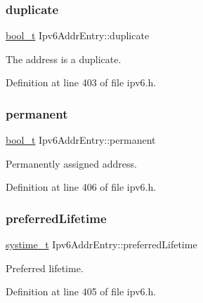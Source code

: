 \subsubsection{\texorpdfstring{duplicate}{duplicate}}
{\footnotesize\ttfamily \hyperlink{compiler__port_8h_a812d16e5494522586b3784e55d479912}{bool\+\_\+t} Ipv6\+Addr\+Entry\+::duplicate}



The address is a duplicate. 



Definition at line 403 of file ipv6.\+h.

\mbox{\label{structIpv6AddrEntry_a196db6647dd1196a1c3a06c8a4083a48}} 
\subsubsection{\texorpdfstring{permanent}{permanent}}
{\footnotesize\ttfamily \hyperlink{compiler__port_8h_a812d16e5494522586b3784e55d479912}{bool\+\_\+t} Ipv6\+Addr\+Entry\+::permanent}



Permanently assigned address. 



Definition at line 406 of file ipv6.\+h.

\mbox{\label{structIpv6AddrEntry_a4d368a125e163baf554e7622edff555f}} 
\subsubsection{\texorpdfstring{preferred\+Lifetime}{preferredLifetime}}
{\footnotesize\ttfamily \hyperlink{compiler__port_8h_ae3e32a98d431a02106616da3071832dd}{systime\+\_\+t} Ipv6\+Addr\+Entry\+::preferred\+Lifetime}



Preferred lifetime. 



Definition at line 405 of file ipv6.\+h.

\mbox{\label{structIpv6AddrEntry_ae4ce939ceef8a1d15ac7d11542215a0f}} 
